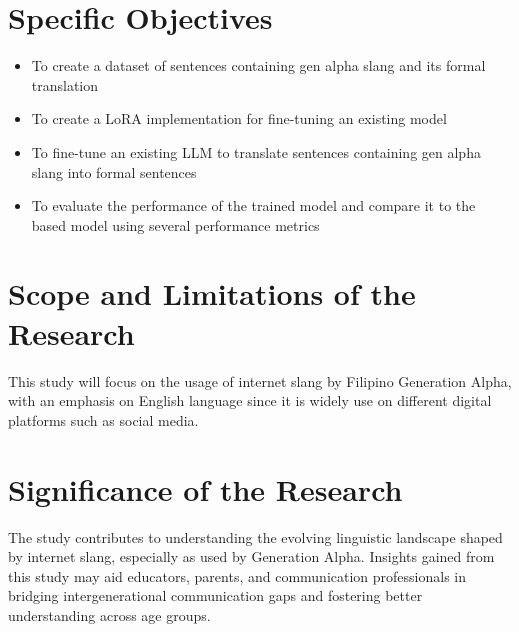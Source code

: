 \section{Specific Objectives}
\label{sec:specific_objectives}
\begin{itemize}
	\item To create a dataset of sentences containing gen alpha slang and its formal translation
	\item To create a LoRA implementation for fine-tuning an existing model
	\item To fine-tune an existing LLM to translate sentences containing gen alpha slang into formal sentences
	\item To evaluate the performance of the trained model and compare it to the based model using several performance metrics
\end{itemize}

\section{Scope and Limitations of the Research}
\label{sec:scope}
This study will focus on the usage of internet slang by Filipino Generation Alpha, with an emphasis on English language since it is widely use on different digital platforms such as social media.

\section{Significance of the Research}
\label{sec:significance}
The study contributes to understanding the evolving linguistic landscape shaped by internet slang, especially as used by Generation Alpha. Insights gained from this study may aid educators, parents, and communication professionals in bridging intergenerational communication gaps and fostering better understanding across age groups.